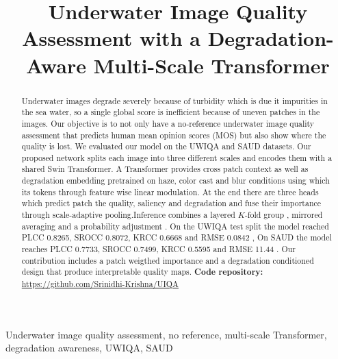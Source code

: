 \documentclass[conference]{IEEEtran}
\begin{document}
\title{Underwater Image Quality Assessment with a Degradation-Aware Multi-Scale Transformer}
\author{
}
\maketitle

\begin{abstract}
Underwater images degrade severely because of turbidity which is due it impurities in the sea water, so a single global score is inefficient because of uneven patches in the images. Our objective is to not only have a  no-reference underwater image quality assessment that predicts human mean opinion scores (MOS) but also show where the quality is lost. We evaluated our model on the UWIQA and SAUD datasets. Our proposed network splits each image into three different scales and encodes them with a shared Swin Transformer. A Transformer provides cross patch context as well as degradation embedding pretrained on haze, color cast and blur conditions using which its tokens through feature wise linear modulation. At the end there are three heads which predict patch the quality, saliency and degradation and fuse their importance through scale-adaptive pooling.Inference combines a layered $K$-fold group , mirrored averaging  and a probability adjustment . On the UWIQA test split the model reached PLCC 0.8265, SROCC 0.8072, KRCC 0.6668 and RMSE 0.0842 , On SAUD the  model reaches PLCC 0.7733, SROCC 0.7499, KRCC 0.5595 and RMSE 11.44 . Our contribution includes a patch weigthed importance and a  degradation conditioned design that produce interpretable quality maps.
\vspace{0.3cm}
\newline\noindent\textbf{Code repository:} \url{https://github.com/Srinidhi-Krishna/UIQA}
\end{abstract}
\vspace{0.3cm}
\begin{IEEEkeywords}
Underwater image quality assessment, no reference, multi-scale Transformer, degradation awareness, UWIQA, SAUD
\end{IEEEkeywords}
\end{document}
